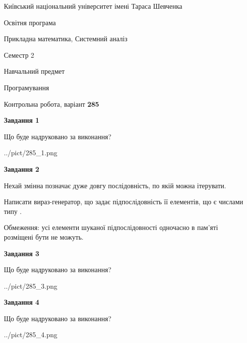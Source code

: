 \documentclass[12pt, ukrainian]{article}
\begin{document}
{{\begin {small}\par
{ \center  Київський національний університет імені Тараса Шевченка \par}
{\parbox {5 cm}{Освітня програма \hfill}{\parbox {8 cm}{Прикладна математика, Системний аналіз \hfill}}\parbox {5 cm}{\hfill Семестр 2}}\par
{\parbox {5 cm} {Навчальний предмет \hfill}\parbox {7 cm}{Програмування \hfill}\parbox {6cm}{\hfill}\par}\vspace{-7pt} \end{small}}{\center Контрольна робота, варіант  \No \textbf
{ 285 }\par}}
{
\begin {large}
{\begin {center}\textbf{Завдання 1}\end {center}}\par
Що буде надруковано за виконання?\par\par
\begin{center}
	{../pict/285_1.png}
\end{center}
\newpage

{\begin {center}\textbf{Завдання 2}\end {center}}\par
Нехай змінна  позначає дуже довгу послідовність, по якій можна ітерувати.

Написати вираз-генератор, що задає підпослідовність її елементів, що є числами типу .

Обмеження: усі елементи шуканої підпослідовності одночасно в пам'яті розміщені бути не можуть.\par
\newpage

{\begin {center}\textbf{Завдання 3}\end {center}}\par
Що буде надруковано за виконання?\par
\begin{center}
	{../pict/285_3.png}
\end{center}
\newpage

{\begin {center}\textbf{Завдання 4}\end {center}}\par
Що буде надруковано за виконання?\par
\begin{center}
	{../pict/285_4.png}
\end{center}
\newpage


\end{large}}
\end{document}
